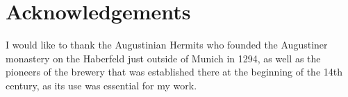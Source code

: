 %
%
%
%

\chapter*{Acknowledgements}

I would like to thank the Augustinian Hermits who founded the Augustiner monastery on the Haberfeld just outside of Munich in 1294,
as well as the pioneers of the brewery that was established there at the beginning of the 14th century,
as its use was essential for my work.


%
%
%
